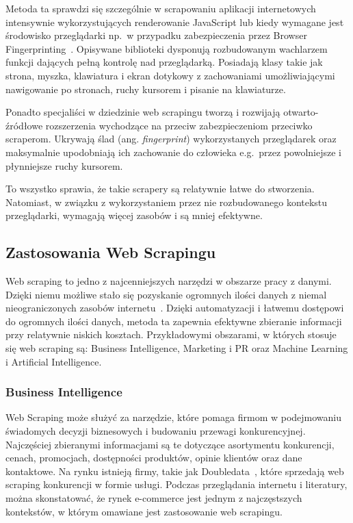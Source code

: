 Metoda ta sprawdzi się szczególnie w scrapowaniu aplikacji internetowych intensywnie wykorzystujących renderowanie JavaScript
lub kiedy wymagane jest środowisko przeglądarki np.~w przypadku zabezpieczenia przez Browser Fingerprinting~\cite{apify-headless-browsers}.
Opisywane biblioteki dysponują rozbudowanym wachlarzem funkcji dających pełną kontrolę nad przeglądarką.
Posiadają klasy takie jak strona, myszka, klawiatura i ekran dotykowy z zachowaniami umożliwiającymi nawigowanie po stronach,
ruchy kursorem i pisanie na klawiaturze.

Ponadto specjaliści w dziedzinie web scrapingu tworzą i rozwijają otwarto-źródłowe rozszerzenia wychodzące na przeciw zabezpieczeniom przeciwko scraperom.
Ukrywają ślad (ang. \emph{fingerprint}) wykorzystanych przeglądarek oraz maksymalnie upodobniają ich zachowanie do człowieka e.g.~przez powolniejsze i płynniejsze ruchy kursorem.

To wszystko sprawia, że takie scrapery są relatywnie łatwe do stworzenia.
Natomiast, w związku z wykorzystaniem przez nie rozbudowanego kontekstu przeglądarki, wymagają więcej zasobów i są mniej efektywne.

\subsection{Zastosowania Web Scrapingu}\label{subsec:web-scraping-applications}

Web scraping to jedno z najcenniejszych narzędzi w obszarze pracy z danymi.
Dzięki niemu możliwe stało się pozyskanie ogromnych ilości danych z niemal nieograniczonych zasobów internetu~\cite{Zhao2017}.
Dzięki automatyzacji i łatwemu dostępowi do ogromnych ilości danych, metoda ta zapewnia efektywne zbieranie informacji przy relatywnie niskich kosztach.
Przykładowymi obszarami, w których stosuje się web scraping są: Business Intelligence, Marketing i PR oraz Machine Learning i Artificial Intelligence.

\subsubsection{Business Intelligence}
Web Scraping może służyć za narzędzie, które pomaga firmom w podejmowaniu świadomych decyzji biznesowych i budowaniu przewagi konkurencyjnej.
Najczęściej zbieranymi informacjami są te dotyczące asortymentu konkurencji, cenach, promocjach, dostępności produktów, opinie klientów oraz dane kontaktowe.
Na rynku istnieją firmy, takie jak Doubledata~\cite{doubledata}, które sprzedają web scraping konkurencji w formie usługi.
Podczas przeglądania internetu i literatury, można skonstatować, że rynek e-commerce jest jednym z najczęstszych kontekstów, w którym omawiane jest zastosowanie web scrapingu.

